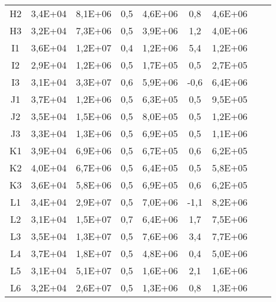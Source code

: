 \begin{center}
\begin{longtable}{ccccccccc}
    H2    & 3,4E+04 & 8,1E+06 & 0,5   & 4,6E+06 & 0,8   & 4,6E+06 \\
    H3    & 3,2E+04 & 7,3E+06 & 0,5   & 3,9E+06 & 1,2   & 4,0E+06 \\
    I1    & 3,6E+04 & 1,2E+07 & 0,4   & 1,2E+06 & 5,4   & 1,2E+06 \\
    I2    & 2,9E+04 & 1,2E+06 & 0,5   & 1,7E+05 & 0,5   & 2,7E+05 \\
    I3    & 3,1E+04 & 3,3E+07 & 0,6   & 5,9E+06 & -0,6  & 6,4E+06 \\
    J1    & 3,7E+04 & 1,2E+06 & 0,5   & 6,3E+05 & 0,5   & 9,5E+05 \\
    J2    & 3,5E+04 & 1,5E+06 & 0,5   & 8,0E+05 & 0,5   & 1,2E+06 \\
    J3    & 3,3E+04 & 1,3E+06 & 0,5   & 6,9E+05 & 0,5   & 1,1E+06 \\
    K1    & 3,9E+04 & 6,9E+06 & 0,5   & 6,7E+05 & 0,6   & 6,2E+05 \\
    K2    & 4,0E+04 & 6,7E+06 & 0,5   & 6,4E+05 & 0,5   & 5,8E+05 \\
    K3    & 3,6E+04 & 5,8E+06 & 0,5   & 6,9E+05 & 0,6   & 6,2E+05 \\
    L1    & 3,4E+04 & 2,9E+07 & 0,5   & 7,0E+06 & -1,1  & 8,2E+06 \\
    L2    & 3,1E+04 & 1,5E+07 & 0,7   & 6,4E+06 & 1,7   & 7,5E+06 \\
    L3    & 3,5E+04 & 1,3E+07 & 0,5   & 7,6E+06 & 3,4   & 7,7E+06 \\
    L4    & 3,7E+04 & 1,8E+07 & 0,5   & 4,8E+06 & 0,4   & 5,0E+06 \\ 
    L5    & 3,1E+04 & 5,1E+07 & 0,5   & 1,6E+06 & 2,1   & 1,6E+06 \\
    L6    & 3,2E+04 & 2,6E+07 & 0,5   & 1,3E+06 & 0,8   & 1,3E+06 \\
\end{longtable}
\end{center}

